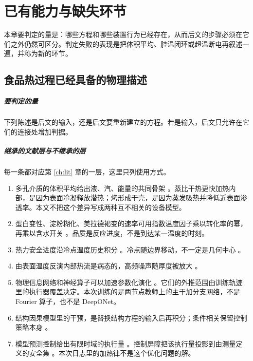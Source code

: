 \chapter{已有能力与缺失环节}

本章要判定的量是：哪些方程和哪些装置行为已经存在，从而后文的步骤必须在它们之外仍然可区分。判定失败的表现是把体积平均、腔温闭环或超温断电再叙述一遍，并称为新的环节。

\section{食品热过程已经具备的物理描述}

\paragraph{要判定的量}
下列陈述是后文的输入，还是后文要重新建立的方程。若是输入，后文只允许在它们的连接处增加判据。

\paragraph{继承的文献层与不继承的层}
每一条都对应第 \ref{ch:lit} 章的一层，这里只列使用方式。

\begin{enumerate}
\item 多孔介质的体积平均给出液、汽、能量的共同骨架 \cite{whitaker1977,datta2007}。蒸比干热更快加热内部，是因为表面冷凝释放潜热；烤形成干壳，是因为蒸发吸热并降低近表面渗透率。本文不把这个差异写成两种互不相关的设备模型。
\item 蛋白变性、淀粉糊化、美拉德褐变的速率可用指数温度因子乘以转化率的幂，再乘以含水开关 \cite{vanboekel2008}。品质是反应进度，不是到达某一温度的时刻。
\item 热力安全进度沿冷点温度历史积分 \cite{holdsworth1997}。冷点随边界移动，不一定是几何中心 \cite{feyissa2013}。
\item 由表面温度反演内部热流是病态的，高频噪声随厚度被放大 \cite{ozisik2000}。
\item 物理信息网络和神经算子可以加速参数化演化 \cite{raissi2019,li2021fno,lu2021deeponet}。它们的外推范围由训练轨迹里的执行器覆盖决定。本次训练的是两节点教师上的主干加分支网络，不是 Fourier 算子，也不是 DeepONet。
\item 结构因果模型里的干预，是替换结构方程的输入后再积分；条件相关保留控制策略本身 \cite{pearl2009}。
\item 模型预测控制给出有限时域的执行量 \cite{rawlings2017}。控制屏障把该执行量投影到由测量定义的安全集 \cite{ames2017cbf}。本次日志里的加热律不是这个优化问题的解。
\end{enumerate}

